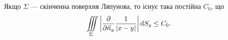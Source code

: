 \begin{theorem}
	Якщо $\Sigma$ --- скінченна поверхня Ляпунова, то існує така постійна $C_0$, що
	\begin{equation}
		\displaystyle\iiint\limits_\Sigma \left| \frac{\partial}{\partial \vec n_y} \frac{1}{|x - y|} \right| \mathop{}\!\mathrm{d} S_y \le C_0.
	\end{equation}
\end{theorem}